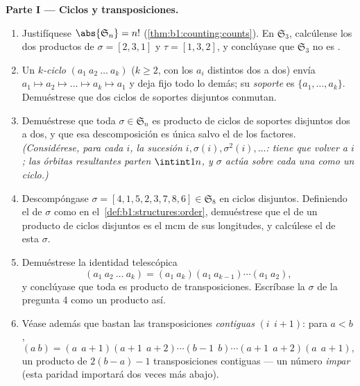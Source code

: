 \begin{problem}
\medskip
\noindent\textbf{Parte I --- Ciclos y transposiciones.}
\begin{enumerate}
  \item Justifíquese $\abs{\mathfrak S_n} = n!$
        (\cref{thm:b1:counting:counts}). En $\mathfrak S_3$, calcúlense
        los dos productos de $\sigma = [2, 3, 1]$ y $\tau = [1, 3, 2]$,
        y conclúyase que $\mathfrak S_3$ no es .
  \item Un \emph{$k$-ciclo} $(a_1\ a_2\ \dots\ a_k)$ ($k \geq 2$, con
        los $a_i$ distintos dos a dos) envía $a_1 \mapsto a_2
        \mapsto \dots \mapsto a_k \mapsto a_1$ y deja fijo todo lo
        demás; su \emph{soporte} es $\{a_1, \dots, a_k\}$.
        Demuéstrese que dos ciclos de soportes disjuntos conmutan.
  \item Demuéstrese que toda $\sigma \in \mathfrak S_n$ es producto de
        ciclos de soportes disjuntos dos a dos, y que esa
        descomposición es única salvo el  de los factores.
        \emph{(Considérese, para cada $i$, la sucesión $i, \sigma(i),
        \sigma^2(i), \dots$: tiene que volver a $i$; las \emph{órbitas}
        resultantes parten $\intint1n$, y $\sigma$ actúa sobre cada
        una como un ciclo.)}
  \item Descompóngase $\sigma = [4, 1, 5, 2, 3, 7, 8, 6] \in
        \mathfrak S_8$ en ciclos disjuntos. Definiendo el
        \emph{} de $\sigma$ como en
        el~\cref{def:b1:structures:order}, demuéstrese que el  de un
        producto de ciclos disjuntos es el mcm de sus longitudes, y
        calcúlese el  de esta $\sigma$.
  \item Demuéstrese la identidad telescópica
        \[
        (a_1\ a_2\ \dots\ a_k)
        = (a_1\ a_k)(a_1\ a_{k-1})\cdots(a_1\ a_2) ,
        \]
        y conclúyase que toda  es producto de
        transposiciones. Escríbase la $\sigma$ de la pregunta 4 como un
        producto así.
  \item Véase además que bastan las transposiciones \emph{contiguas}
        $(i\ \ i{+}1)$: para $a < b$,
        \[
        (a\ b) = (a\ \ a{+}1)(a{+}1\ \ a{+}2)\cdots(b{-}1\ \ b)
        \cdots(a{+}1\ \ a{+}2)(a\ \ a{+}1),
        \]
        un producto de $2(b - a) - 1$ transposiciones contiguas ---
        un número \emph{impar} (esta paridad importará dos veces más
        abajo).
\end{enumerate}


\end{problem}
